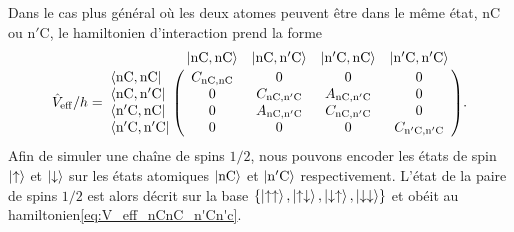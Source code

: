 Dans le cas plus général où les deux atomes peuvent être dans le même état, $\mathrm{nC}$ ou $\mathrm{n'C}$, le hamiltonien d'interaction prend la forme
\begin{equation}
\label{eq:V_eff_nCnC_n'Cn'c}
\hat{V}_{\mathrm{eff}}/h = \bordermatrix{
~ 	&\ket{\mathrm{nC},\mathrm{nC}} 	&\ket{\mathrm{nC},\mathrm{n'C}} 
&\ket{\mathrm{n'C},\mathrm{nC}} &\ket{\mathrm{n'C},\mathrm{n'C}} \cr
	\bra{\mathrm{nC},\mathrm{nC}}	& C_{\mathrm{nC},\mathrm{nC}} & 0 & 0 & 0 \cr 
	\bra{\mathrm{nC},\mathrm{n'C}} 	& 0 & C_{\mathrm{nC},\mathrm{n'C}} & A_{\mathrm{nC},\mathrm{n'C}} & 0 \cr
	\bra{\mathrm{n'C},\mathrm{nC}} 	& 0 & A_{\mathrm{nC},\mathrm{n'C}} & C_{\mathrm{nC},\mathrm{n'C}} & 0 \cr
	\bra{\mathrm{n'C},\mathrm{n'C}} & 0 & 0 &  0	& C_{\mathrm{n'C},\mathrm{n'C}}\cr
	}.
\end{equation}
Afin de simuler une chaîne de spins $1/2$, nous pouvons encoder les états de spin $\ket{\uparrow}$ et $\ket{\downarrow}$ sur les états atomiques $\ket{\mathrm{nC}}$ et $\ket{\mathrm{n'C}}$ respectivement.
L'état de la paire de spins $1/2$ est alors décrit sur la base $\{ \ket{\uparrow \uparrow},\ket{\uparrow \downarrow}, \ket{\downarrow\uparrow}, \ket{\downarrow\downarrow} \}$ et obéit au hamiltonien\eqref{eq:V_eff_nCnC_n'Cn'c}.
%
%
%

